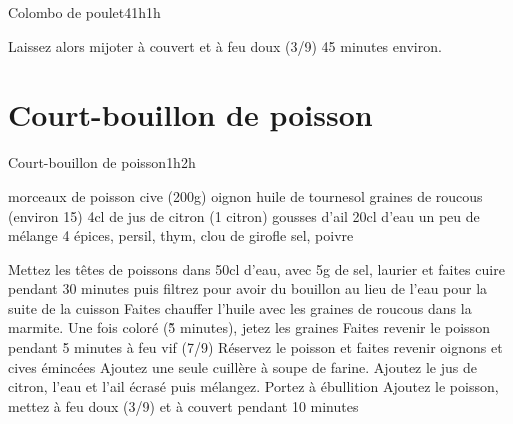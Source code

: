 {\begin{recette}{Colombo de poulet}{4}{1h}{1h}
\begin{cuisson}
Laissez alors mijoter à couvert et à feu doux (3/9) 45 minutes environ.
\end{cuisson}
\end{recette}

\section{Court-bouillon de poisson}
\begin{recette}{Court-bouillon de poisson}{}{1h}{2h}
\begin{ingredients}
\ingredient morceaux de poisson
 cive (200g)
 oignon
\ingredient huile de tournesol
\ingredient graines de roucous (environ 15)
\ingredient 4cl de jus de citron (1 citron)
 gousses d'ail
\ingredient 20cl d'eau
\ingredient un peu de mélange 4 épices, persil, thym, clou de girofle
\ingredient sel, poivre
\end{ingredients}

\begin{preparation}
\etape [facultatif] Mettez les têtes de poissons dans 50cl d'eau, avec 5g de sel, laurier et faites cuire pendant 30 minutes puis filtrez pour avoir du bouillon au lieu de l'eau pour la suite de la cuisson
\etape Faites chauffer l'huile avec les graines de roucous dans la marmite. Une fois coloré (\~5 minutes), jetez les graines
\etape Faites revenir le poisson pendant 5 minutes à feu vif (7/9)
\etape Réservez le poisson et faites revenir oignons et cives émincées
\etape Ajoutez une seule cuillère à soupe de farine. Ajoutez le jus de citron, l'eau et l'ail écrasé puis mélangez. 
\etape Portez à ébullition
\etape Ajoutez le poisson, mettez à feu doux (3/9) et à couvert pendant 10 minutes
\end{preparation}
\end{recette}

}
